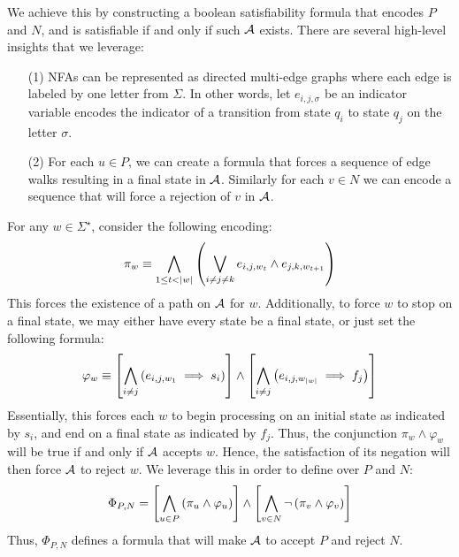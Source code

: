 \documentclass[12pt]{article}
\begin{document}
We achieve this by constructing a boolean satisfiability formula
that encodes \(P\) and \(N\),
and is satisfiable if and only if such \(\mathcal{A}\) exists.
There are several high-level insights that we leverage:
\begin{enumerate}
  \item[(1)]
    NFAs can be represented as directed multi-edge graphs
    where each edge is labeled by one letter from \(\Sigma\).
    In other words, let \(e_{i, j, \sigma}\) be an indicator
    variable encodes the indicator of a transition from state \(q_i\)
    to state \(q_j\) on the letter \(\sigma\).

  \item[(2)]
    For each \(u \in P\),
    we can create a formula that forces a sequence of edge walks
    resulting in a final state in \(\mathcal{A}\).
    Similarly for each \(v \in N\) we can encode a sequence that will force
    a rejection of \(v\) in \(\mathcal{A}\).

\end{enumerate}

For any \(w \in \Sigma^\star\), consider the following encoding:
\begin{align*}
  \pi_w \equiv
    \bigwedge_{1 \leq t < \left\lvert w\right\rvert}
      \left(\bigvee_{i \neq j \neq k}
        e_{i, j, w_t} \land e_{j, k, w_{t + 1}}\right)
\end{align*}
This forces the existence of a path on \(\mathcal{A}\) for \(w\).
Additionally, to force \(w\) to stop on a final state,
we may either have every state be a final state,
or just set the following formula:
\begin{align*}
  \varphi_w \equiv
    \left[\bigwedge_{i \neq j} \left(e_{i, j, w_{1}} \implies s_i\right)\right]
      \land
    \left[\bigwedge_{i \neq j} \left(e_{i, j, w_{\left\lvert w\right\rvert}} \implies f_j\right)\right]
\end{align*}
Essentially, this forces each \(w\) to begin processing on an initial state
as indicated by \(s_i\), and end on a final state as indicated by \(f_j\).
Thus, the conjunction \(\pi_w \land \varphi_w\) will be true if and
only if \(\mathcal{A}\) accepts \(w\).
Hence, the satisfaction of
its negation will then force \(\mathcal{A}\) to reject \(w\).
We leverage this in order to define
over \(P\) and \(N\):
\begin{align*}
  \Phi_{P, N} =
    \left[\bigwedge_{u \in P} \left(\pi_u \land \varphi_u\right)\right]
      \land
    \left[\bigwedge_{v \in N} \neg\left(\pi_v \land \varphi_v\right)\right]
\end{align*}
Thus, \(\Phi_{P, N}\) defines a formula that will make
\(\mathcal{A}\) to accept \(P\) and reject \(N\).
\end{document}
